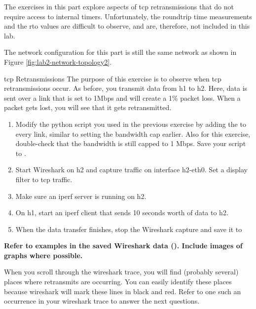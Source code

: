 The exercises in this part explore aspects of \ac{tcp} retransmissions that do not require access to internal timers. Unfortunately, the roundtrip time measurements and the \ac{rto} values are difficult to observe, and are, therefore, not included in this lab.

The network configuration for this part is still the same network as shown in Figure \ref{fig:lab2-network-topology2}.


\begin{exercise}{\ac{tcp} Retransmissions}
The purpose of this exercise is to observe when \ac{tcp} retransmissions occur. As before, you transmit data from h1 to h2. Here, data is sent over a link that is set to 1Mbps and will create a 1\% packet loss. When a packet gets lost, you will see that it gets retransmitted.

\begin{enumerate}
	\item Modify the python script you used in the previous exercise by adding the  to every link, similar to setting the bandwidth cap earlier. Also for this exercise, double-check that the bandwidth is still capped to 1 Mbps. Save your script to .
	\item Start Wireshark on h2 and capture traffic on interface h2-eth0. Set a display filter to \ac{tcp} traffic. 
	\item Make sure an iperf server is  running on h2.
	\item On h1, start an iperf client that sends 10 seconds worth of data to h2.
	\item When the data transfer finishes, stop the Wireshark capture and save it to 
\end{enumerate}

\textbf{Refer to examples in the saved Wireshark data (). Include images of graphs where possible.}

When you scroll through the wireshark trace, you will find (probably several) places where retransmits are occurring. You can easily identify these places because wireshark will mark these lines in black and red. Refer to one such an occurrence in your wireshark trace to answer the next questions.
\end{exercise}

